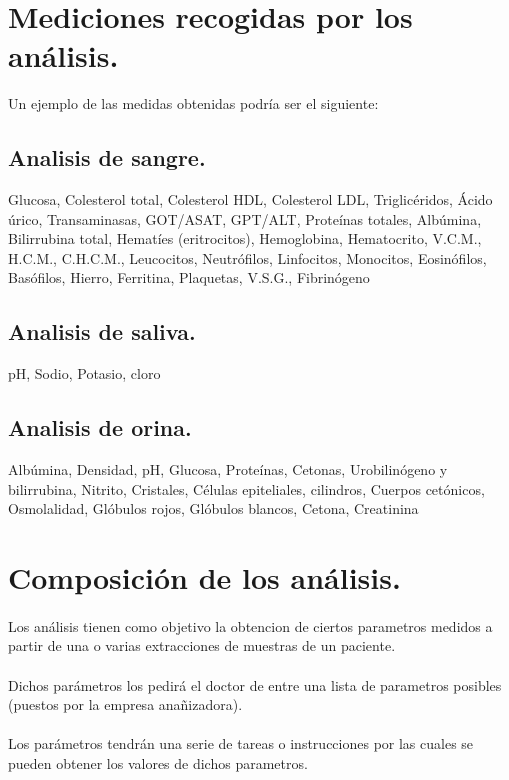 \documentclass[a4paper,10pt]{article}
\begin{document}
\section{Mediciones recogidas por los análisis.}
Un ejemplo de las medidas obtenidas podría ser el siguiente:
\subsection{Analisis de sangre.}
Glucosa, Colesterol total, Colesterol HDL, Colesterol LDL, Triglicéridos, Ácido úrico, Transaminasas, GOT/ASAT, GPT/ALT, Proteínas totales, Albúmina, Bilirrubina total, Hematíes (eritrocitos), Hemoglobina, Hematocrito, V.C.M., H.C.M., C.H.C.M., Leucocitos, Neutrófilos, Linfocitos, Monocitos, Eosinófilos, Basófilos, Hierro, Ferritina, Plaquetas, V.S.G., Fibrinógeno \subsection{Analisis de saliva.}
pH, Sodio, Potasio, cloro
\subsection{Analisis de orina.}
Albúmina, Densidad, pH, Glucosa, Proteínas, Cetonas, Urobilinógeno y bilirrubina, Nitrito, Cristales, Células epiteliales, cilindros, Cuerpos cetónicos, Osmolalidad, Glóbulos rojos, Glóbulos blancos, Cetona, Creatinina
\pagebreak

\section{Composición de los análisis.}
\paragraph{}
Los análisis tienen como objetivo la obtencion de ciertos parametros medidos a partir de una o varias extracciones de muestras de un paciente.

\paragraph{}
Dichos parámetros los pedirá el doctor de entre una lista de parametros posibles (puestos por la empresa anañizadora).

\paragraph{}
Los parámetros tendrán una serie de tareas o instrucciones por las cuales se pueden obtener los valores de dichos parametros.
\end{document}
